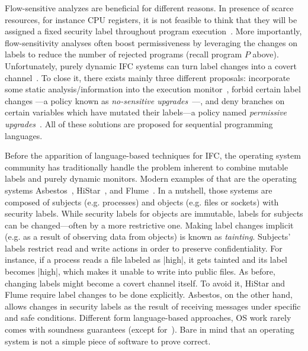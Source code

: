 
Flow-sensitive analyzes are beneficial for different reasons. In presence of
scarce resources, for instance CPU registers, it is not feasible to think that
they will be assigned a fixed security label throughout program
execution~\citep{BonelliCM05}. More importantly, flow-sensitivity analyses often
boost permissiveness by leveraging the changes on labels to reduce the number of
rejected programs (recall program $P$ above). Unfortunately, purely dynamic IFC
systems can turn label changes into a covert channel~\citep{Russo:2010}. To
close it, there exists mainly three different proposals:
incorporate some static analysis/information into the execution
monitor~\citep{Russo:2010,stefan:lio,10.1109/SP.2013.10}, forbid certain label
changes ---a policy known as \emph{no-sensitive
  upgrades}~\citep{Austin:Flanagan:PLAS10}---, and deny branches on certain
variables which have mutated their labels---a policy named \emph{permissive
  upgrades}~\citep{Austin:Flanagan:PLAS10}. All of these solutions are proposed
for sequential programming languages.


Before the apparition of language-based techniques for IFC, the operating system
community has traditionally handle the problem inherent to combine mutable
labels and purely dynamic monitors. Modern examples of that are the operating
systems Asbestos~\citep{Efstathopoulos:2005}, HiStar~\citep{zeldovich:histar},
and Flume~\citep{krohn:flume}. In a nutshell, those systems are composed of
subjects (e.g. processes) and objects (e.g. files or sockets) with security
labels. While security labels for objects are immutable, labels for subjects can
be changed---often by a more restrictive one. Making label changes implicit
(e.g. as a result of observing data from objects) is known as
\emph{tainting}. Subjects' labels restrict read and write actions in order to
preserve confidentiality. For instance, if a process reads a file labeled as
|high|, it gets tainted and its label becomes |high|, which makes it unable to
write into public files. As before, changing labels might become a covert
channel itself. To avoid it, HiStar and Flume require label changes to be done
explicitly.  Asbestos, on the other hand, allows changes in security labels as
the result of receiving messages under specific and safe conditions. Different
form language-based approaches, OS work rarely comes with soundness guarantees
(except for~\citep{Krohn,seL4IF}). Bare in mind that an operating system is not
a simple piece of software to prove correct.


